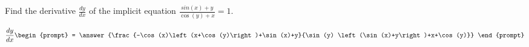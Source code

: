 \documentclass{ximera}
\author{Gregory Hartman \and Matthew Carr}
\begin{document}
\begin{exercise}




Find the derivative $\frac{dy}{dx}$ of the implicit equation $\frac{sin(x)+y}{\cos(y)+x}=1$.

\[
\frac{dy}{dx}
\begin{prompt}
= \answer{\frac{-\cos (x)\left(x+\cos (y)\right)+\sin (x)+y}{\sin (y) \left(\sin (x)+y\right)+x+\cos (y)}}
\end{prompt}
\]


\end{exercise}
\end{document}
